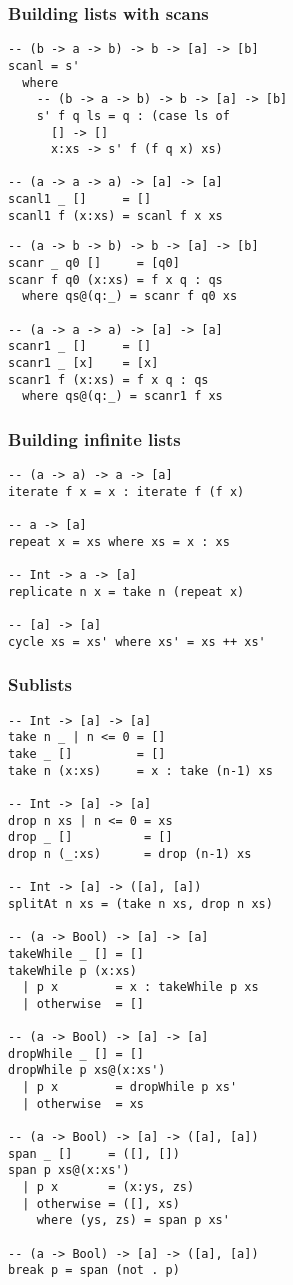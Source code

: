 \subsubsection{Building lists with scans}
\begin{verbatim}
-- (b -> a -> b) -> b -> [a] -> [b]
scanl = s'
  where
    -- (b -> a -> b) -> b -> [a] -> [b]
    s' f q ls = q : (case ls of
      [] -> []
      x:xs -> s' f (f q x) xs)

-- (a -> a -> a) -> [a] -> [a]
scanl1 _ []     = []
scanl1 f (x:xs) = scanl f x xs
\end{verbatim}

\begin{verbatim}
-- (a -> b -> b) -> b -> [a] -> [b]
scanr _ q0 []     = [q0]
scanr f q0 (x:xs) = f x q : qs
  where qs@(q:_) = scanr f q0 xs

-- (a -> a -> a) -> [a] -> [a]
scanr1 _ []     = []
scanr1 _ [x]    = [x]
scanr1 f (x:xs) = f x q : qs
  where qs@(q:_) = scanr1 f xs                           
\end{verbatim}

\subsubsection{Building infinite lists}
\begin{verbatim}
-- (a -> a) -> a -> [a]
iterate f x = x : iterate f (f x)

-- a -> [a]
repeat x = xs where xs = x : xs

-- Int -> a -> [a]
replicate n x = take n (repeat x)

-- [a] -> [a]
cycle xs = xs' where xs' = xs ++ xs'
\end{verbatim}

\subsubsection{Sublists}
\begin{verbatim}
-- Int -> [a] -> [a]
take n _ | n <= 0 = []
take _ []         = []
take n (x:xs)     = x : take (n-1) xs

-- Int -> [a] -> [a]
drop n xs | n <= 0 = xs
drop _ []          = []
drop n (_:xs)      = drop (n-1) xs

-- Int -> [a] -> ([a], [a])
splitAt n xs = (take n xs, drop n xs)

-- (a -> Bool) -> [a] -> [a]
takeWhile _ [] = []
takeWhile p (x:xs)
  | p x        = x : takeWhile p xs
  | otherwise  = []

-- (a -> Bool) -> [a] -> [a]
dropWhile _ [] = []
dropWhile p xs@(x:xs')
  | p x        = dropWhile p xs'
  | otherwise  = xs

-- (a -> Bool) -> [a] -> ([a], [a])
span _ []     = ([], [])
span p xs@(x:xs')
  | p x       = (x:ys, zs)
  | otherwise = ([], xs)
    where (ys, zs) = span p xs'

-- (a -> Bool) -> [a] -> ([a], [a])
break p = span (not . p)
\end{verbatim}

